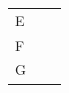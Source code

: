 {\begin{tabular}[t]{|l|l|l|}
    
        E &
    
    
         &
    
    
     \tabularnewline\cline{1-1}\cline{2-2}\cline{3-3}
    
    
        F &
    
    
         &
    
    
     \tabularnewline\cline{1-1}\cline{2-2}\cline{3-3}
    
    
        G &
    
    
         &
    
    
     \tabularnewline\cline{1-1}\cline{2-2}\cline{3-3}
    \end{tabular}} %
      \addtocounter{footnote}{-0}
      
